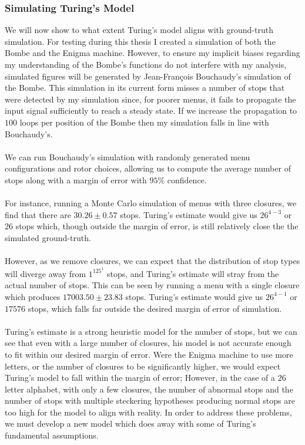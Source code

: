 \subsubsection{Simulating Turing's Model}
We will now show to what extent Turing's model aligns with
ground-truth simulation. For testing during this thesis I created a
simulation of both the Bombe and the Enigma machine. However, to
ensure my implicit biases regarding my understanding of the Bombe's
functions do not interfere with my analysis, simulated figures will
be generated by Jean-François Bouchaudy's simulation
of the Bombe. This simulation in its current form misses a number of
stops that were detected by my simulation since, for poorer menus, it
fails to propagate the input signal sufficiently to reach a steady
state. If we increase the propagation to $100$ loops per position of
the Bombe then my simulation falls in line with Bouchaudy's.
\\\\We can run Bouchaudy's simulation with randomly generated menu
configurations and rotor choices, allowing us to compute the average
number of stops along with a margin of error with $95\%$ confidence.
\\\\ For instance, running a Monte Carlo simulation of menus with
three closures, we find that there are $30.26\pm0.57$ stops. Turing's
estimate would give us $26^{4-3}$ or $26$ stops which, though outside
the margin of error, is still relatively close the the simulated ground-truth.
\\\\However, as we remove closures, we can expect that the
distribution of stop types will diverge away from $1^125^1$ stops,
and Turing's estimate will stray from the actual number of stops.
This can be seen by running a menu with a single closure which
produces $17003.50\pm23.83$ stops. Turing's estimate would give us
$26^{4-1}$ or $17576$ stops, which falls far outside the desired margin
of error of simulation.
\\\\Turing's estimate is a strong heuristic model for the number of
stops, but we can see that even with a large number of closures, his
model is not accurate enough to fit within our desired margin of
error. Were the Enigma machine to use more letters, or the number of
closures to be significantly higher, we would expect Turing's model
to fall within the margin of error; However, in the case of a $26$
letter alphabet, with only a few closures, the number of abnormal
stops and the number of stops with multiple steckering hypotheses
producing normal stops are too high for the model to align with
reality. In order to address these problems, we must develop a new
model which does away with some of Turing's fundamental assumptions.
